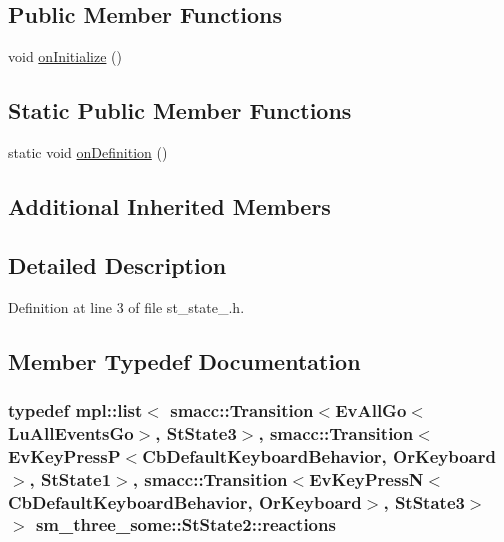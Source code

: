 \subsection*{Public Member Functions}
\begin{DoxyCompactItemize}
\item 
void \hyperlink{structsm__three__some_1_1StState2_a31e1bc14ec72b4fa9dcc6a11d8e77762}{on\+Initialize} ()
\end{DoxyCompactItemize}
\subsection*{Static Public Member Functions}
\begin{DoxyCompactItemize}
\item 
static void \hyperlink{structsm__three__some_1_1StState2_a6fbadc32e16e7c1defafe35a6e1b08da}{on\+Definition} ()
\end{DoxyCompactItemize}
\subsection*{Additional Inherited Members}


\subsection{Detailed Description}


Definition at line 3 of file st\+\_\+state\+\_.\+h.



\subsection{Member Typedef Documentation}
\subsubsection[{\texorpdfstring{reactions}{reactions}}]{\setlength{\rightskip}{0pt plus 5cm}typedef mpl\+::list$<$ {\bf smacc\+::\+Transition}$<$Ev\+All\+Go$<$Lu\+All\+Events\+Go$>$, {\bf St\+State3}$>$, {\bf smacc\+::\+Transition}$<$Ev\+Key\+PressP$<$Cb\+Default\+Keyboard\+Behavior, {\bf Or\+Keyboard}$>$, {\bf St\+State1}$>$, {\bf smacc\+::\+Transition}$<$Ev\+Key\+PressN$<$Cb\+Default\+Keyboard\+Behavior, {\bf Or\+Keyboard}$>$, {\bf St\+State3}$>$ $>$ {\bf sm\+\_\+three\+\_\+some\+::\+St\+State2\+::reactions}}\hypertarget{structsm__three__some_1_1StState2_a84ae1c97ec7653195444d6a17095187f}{}\label{structsm__three__some_1_1StState2_a84ae1c97ec7653195444d6a17095187f}


